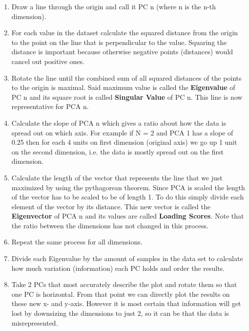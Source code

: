 \documentclass{article}
\begin{document}
\begin{enumerate}
	\item Draw a line through the origin and call it PC n (where n is the n-th dimension). 
	
	\item For each value in the dataset calculate the squared distance from the origin to the point on the line that is perpendicular to the value. Squaring the distance is important because otherwise negative points (distances) would cancel out positive ones. 
	
	\item Rotate the line until the combined sum of all squared distances of the points to the origin is maximal. Said maximum value is called the \textbf{Eigenvalue} of PC n and its square root is called \textbf{Singular Value} of PC n. This line is now representative for PCA n. 
	
	\item Calculate the slope of PCA n which gives a ratio about how the data is spread out on which axis. For example if N = 2 and PCA 1 has a slope of 0.25 then for each 4 units on first dimension (original axis) we go up 1 unit on the second dimension, i.e. the data is mostly spread out on the first dimension. 
	
	\item Calculate the length of the vector that represents the line that we just maximized by using the pythagorean theorem. Since PCA is scaled the length of the vector has to be scaled to be of length 1. To do this simply divide each element of the vector by its distance. This new vector is called the \textbf{Eigenvector} of PCA n and its values are called \textbf{Loading Scores}. Note that the ratio between the dimensions has not changed in this process. 
	
	\item Repeat the same process for all dimensions. 
	
	\item Divide each Eigenvalue by the amount of samples in the data set to calculate how much variation (information) each PC holds and order the results. 
	
	\item Take 2 PCs that most accurately describe the plot and rotate them so that one PC is horizontal. From that point we can directly plot the results on these new x- and y-axis. However it is most certain that information will get lost by downsizing the dimensions to just 2, so it can be that the data is misrepresented. 
\end{enumerate}
\end{document}
